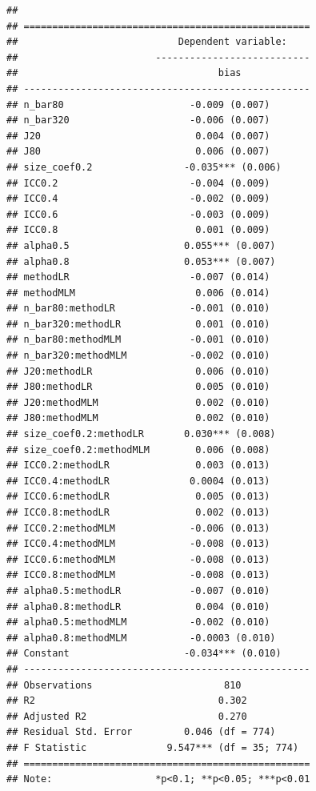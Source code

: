 \documentclass[
]{book}
\begin{document}
\begin{verbatim}
## 
## ==================================================
##                            Dependent variable:    
##                        ---------------------------
##                                   bias            
## --------------------------------------------------
## n_bar80                      -0.009 (0.007)       
## n_bar320                     -0.006 (0.007)       
## J20                           0.004 (0.007)       
## J80                           0.006 (0.007)       
## size_coef0.2                -0.035*** (0.006)     
## ICC0.2                       -0.004 (0.009)       
## ICC0.4                       -0.002 (0.009)       
## ICC0.6                       -0.003 (0.009)       
## ICC0.8                        0.001 (0.009)       
## alpha0.5                    0.055*** (0.007)      
## alpha0.8                    0.053*** (0.007)      
## methodLR                     -0.007 (0.014)       
## methodMLM                     0.006 (0.014)       
## n_bar80:methodLR             -0.001 (0.010)       
## n_bar320:methodLR             0.001 (0.010)       
## n_bar80:methodMLM            -0.001 (0.010)       
## n_bar320:methodMLM           -0.002 (0.010)       
## J20:methodLR                  0.006 (0.010)       
## J80:methodLR                  0.005 (0.010)       
## J20:methodMLM                 0.002 (0.010)       
## J80:methodMLM                 0.002 (0.010)       
## size_coef0.2:methodLR       0.030*** (0.008)      
## size_coef0.2:methodMLM        0.006 (0.008)       
## ICC0.2:methodLR               0.003 (0.013)       
## ICC0.4:methodLR              0.0004 (0.013)       
## ICC0.6:methodLR               0.005 (0.013)       
## ICC0.8:methodLR               0.002 (0.013)       
## ICC0.2:methodMLM             -0.006 (0.013)       
## ICC0.4:methodMLM             -0.008 (0.013)       
## ICC0.6:methodMLM             -0.008 (0.013)       
## ICC0.8:methodMLM             -0.008 (0.013)       
## alpha0.5:methodLR            -0.007 (0.010)       
## alpha0.8:methodLR             0.004 (0.010)       
## alpha0.5:methodMLM           -0.002 (0.010)       
## alpha0.8:methodMLM           -0.0003 (0.010)      
## Constant                    -0.034*** (0.010)     
## --------------------------------------------------
## Observations                       810            
## R2                                0.302           
## Adjusted R2                       0.270           
## Residual Std. Error         0.046 (df = 774)      
## F Statistic              9.547*** (df = 35; 774)  
## ==================================================
## Note:                  *p<0.1; **p<0.05; ***p<0.01
\end{verbatim}
\end{document}
